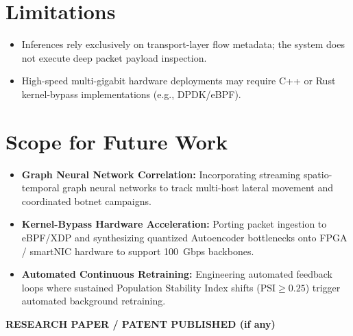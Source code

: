 \documentclass[12pt,a4paper]{report}
\begin{document}
\section{Limitations}
\begin{itemize}
    \item Inferences rely exclusively on transport-layer flow metadata; the system does not execute deep packet payload inspection.
    \item High-speed multi-gigabit hardware deployments may require C++ or Rust kernel-bypass implementations (e.g., DPDK/eBPF).
\end{itemize}

\section{Scope for Future Work}
\begin{itemize}
    \item \textbf{Graph Neural Network Correlation:} Incorporating streaming spatio-temporal graph neural networks to track multi-host lateral movement and coordinated botnet campaigns.
    \item \textbf{Kernel-Bypass Hardware Acceleration:} Porting packet ingestion to eBPF/XDP and synthesizing quantized Autoencoder bottlenecks onto FPGA / smartNIC hardware to support 100~Gbps backbones.
    \item \textbf{Automated Continuous Retraining:} Engineering automated feedback loops where sustained Population Stability Index shifts ($\text{PSI} \ge 0.25$) trigger automated background retraining.
\end{itemize}

\clearpage
\begin{center}
{\Large\bfseries RESEARCH PAPER / PATENT PUBLISHED (if any)}\label{sec:paper_published}\\[0.6cm]
\end{center}
\end{document}
